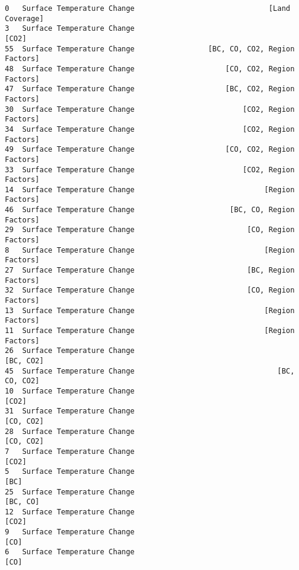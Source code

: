 \documentclass[11pt]{article}
\begin{document}
\begin{tcolorbox}[breakable, size=fbox, boxrule=.5pt, pad at break*=1mm, opacityfill=0]
\begin{Verbatim}[commandchars=\\\{\}]
0   Surface Temperature Change                               [Land Coverage]
3   Surface Temperature Change                                         [CO2]
55  Surface Temperature Change                 [BC, CO, CO2, Region Factors]
48  Surface Temperature Change                     [CO, CO2, Region Factors]
47  Surface Temperature Change                     [BC, CO2, Region Factors]
30  Surface Temperature Change                         [CO2, Region Factors]
34  Surface Temperature Change                         [CO2, Region Factors]
49  Surface Temperature Change                     [CO, CO2, Region Factors]
33  Surface Temperature Change                         [CO2, Region Factors]
14  Surface Temperature Change                              [Region Factors]
46  Surface Temperature Change                      [BC, CO, Region Factors]
29  Surface Temperature Change                          [CO, Region Factors]
8   Surface Temperature Change                              [Region Factors]
27  Surface Temperature Change                          [BC, Region Factors]
32  Surface Temperature Change                          [CO, Region Factors]
13  Surface Temperature Change                              [Region Factors]
11  Surface Temperature Change                              [Region Factors]
26  Surface Temperature Change                                     [BC, CO2]
45  Surface Temperature Change                                 [BC, CO, CO2]
10  Surface Temperature Change                                         [CO2]
31  Surface Temperature Change                                     [CO, CO2]
28  Surface Temperature Change                                     [CO, CO2]
7   Surface Temperature Change                                         [CO2]
5   Surface Temperature Change                                          [BC]
25  Surface Temperature Change                                      [BC, CO]
12  Surface Temperature Change                                         [CO2]
9   Surface Temperature Change                                          [CO]
6   Surface Temperature Change                                          [CO]


\end{Verbatim}
\end{tcolorbox}
\end{document}
